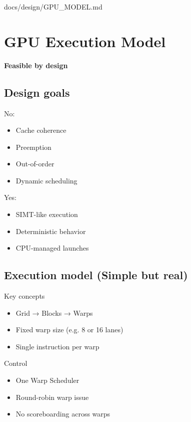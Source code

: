 \begin{relocated}{docs/design/GPU_MODEL.md}
\section{GPU Execution Model}\label{ds:ch:gpu-model}

\textbf{Feasible by design}

\subsection{Design goals}\label{ds:ch:gpu-model:design-goals}

\bad{} No:

\begin{itemize}
\tightlist
\item
  Cache coherence
\item
  Preemption
\item
  Out-of-order
\item
  Dynamic scheduling
\end{itemize}

\ok{} Yes:

\begin{itemize}
\tightlist
\item
  SIMT-like execution
\item
  Deterministic behavior
\item
  CPU-managed launches
\end{itemize}

\subsection{Execution model (Simple but real)}\label{ds:ch:gpu-model:execution-model-simple-but-real}

Key concepts

\begin{itemize}
\tightlist
\item
  Grid → Blocks → Warps
\item
  Fixed warp size (e.g. 8 or 16 lanes)
\item
  Single instruction per warp
\end{itemize}

Control

\begin{itemize}
\tightlist
\item
  One Warp Scheduler
\item
  Round-robin warp issue
\item
  No scoreboarding across warps
\end{itemize}


\end{relocated}
